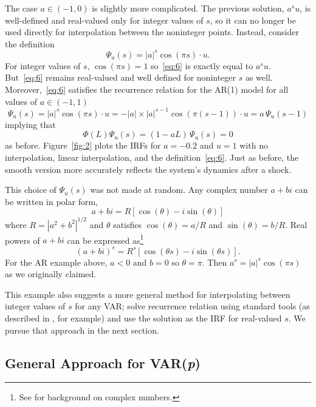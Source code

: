 \documentclass[12pt,fleqn]{article}
\begin{document}
The case $a \in (-1, 0)$ is slightly more complicated.  The previous
solution, $a^s u$, is well-defined and real-valued only for integer
values of $s$, so it can no longer be used directly for interpolation
between the noninteger points. Instead, consider the definition
\begin{equation}
  \label{eq:6}
  \Psi_u(s) = |a|^s \cos(\pi s) \cdot u.
\end{equation}
For integer values of $s$, $\cos(\pi s) = 1$ so~\eqref{eq:6} is
exactly equal to $a^s u$. But~\eqref{eq:6} remains real-valued and
well defined for noninteger $s$ as well. Moreover,~\eqref{eq:6}
satisfies the recurrence relation for the AR(1) model for all values
of $a \in (-1,1)$
\begin{equation*}
  \Psi_u(s) = |a|^s \cos(\pi s) \cdot u = - |a| \times |a|^{s-1} \cos(\pi (s-1)) \cdot u = a \, \Psi_u(s-1)
\end{equation*}
implying that
\begin{equation*}
  \Phi(L) \Psi_u(s) = (1 - a L) \, \Psi_u(s) = 0
\end{equation*}
as before. Figure~\ref{fig:2} plots the IRFs for $a = -0.2$ and
$u = 1$ with no interpolation, linear interpolation, and the
definition~\eqref{eq:6}. Just as before, the smooth version more
accurately reflects the system's dynamics after a shock.

This choice of $\Psi_u(s)$ was not made at random. Any complex
number $a + bi$ can be written in polar form,
\[
a + bi = R [\cos(\theta) - i \sin(\theta)]
\]
where $R = |a^2 + b^2|^{1/2}$ and $\theta$ satisfies
$\cos(\theta) = a/R$ and $\sin(\theta) = b/R$. Real powers of $a + bi$
can be expressed as\footnote{%
  See \citet{Ham:94} for background on complex numbers.} %
\[
(a + bi)^s = R^s [\cos(\theta s) - i \sin(\theta s)].
\]
For the AR example above, $a < 0$ and $b = 0$ so $\theta = \pi$.
Then $a^s = |a|^s \cos(\pi s)$ as we originally claimed.

This example also suggests a more general method for interpolating
between integer values of $s$ for any VAR; solve recurrence relation
using standard tools (as described in \citealp{Ham:94}, for example)
and use the solution as the IRF for real-valued $s$. We pursue that
approach in the next section.

\subsection{General Approach for VAR(\textit{p})}
\label{S2.2}
\end{document}

